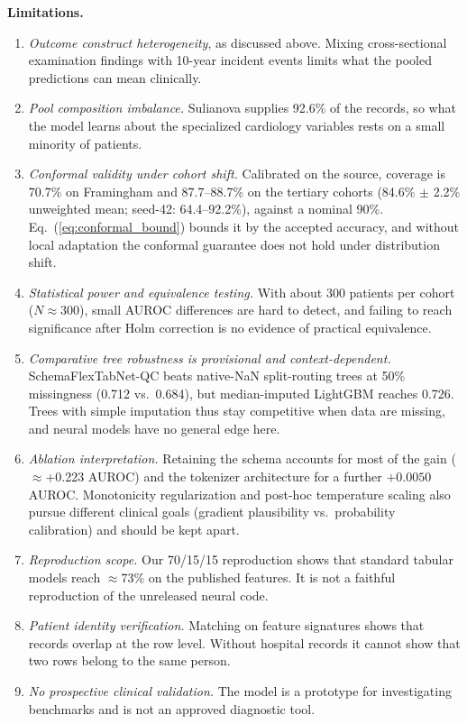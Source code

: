 \documentclass[conference]{IEEEtran}
\newcommand{\sfn}{SchemaFlexTabNet-QC}
\begin{document}
\textbf{Limitations.}
\begin{enumerate}
\item \emph{Outcome construct heterogeneity}, as discussed above. Mixing cross-sectional examination findings with 10-year incident events limits what the pooled predictions can mean clinically.
\item \emph{Pool composition imbalance.} Sulianova supplies 92.6\% of the records, so what the model learns about the specialized cardiology variables rests on a small minority of patients.
\item \emph{Conformal validity under cohort shift.} Calibrated on the source, coverage is 70.7\% on Framingham and 87.7--88.7\% on the tertiary cohorts (84.6\% $\pm$ 2.2\% unweighted mean; seed-42: 64.4--92.2\%), against a nominal 90\%. Eq.~(\ref{eq:conformal_bound}) bounds it by the accepted accuracy, and without local adaptation the conformal guarantee does not hold under distribution shift.
\item \emph{Statistical power and equivalence testing.} With about 300 patients per cohort ($N\approx 300$), small AUROC differences are hard to detect, and failing to reach significance after Holm correction is no evidence of practical equivalence.
\item \emph{Comparative tree robustness is provisional and context-dependent.} \sfn{} beats native-NaN split-routing trees at 50\% missingness (0.712 vs.\ 0.684), but median-imputed LightGBM reaches 0.726. Trees with simple imputation thus stay competitive when data are missing, and neural models have no general edge here.
\item \emph{Ablation interpretation.} Retaining the schema accounts for most of the gain ($\approx$+0.223 AUROC) and the tokenizer architecture for a further $+0.0050$ AUROC. Monotonicity regularization and post-hoc temperature scaling also pursue different clinical goals (gradient plausibility vs.\ probability calibration) and should be kept apart.
\item \emph{Reproduction scope.} Our 70/15/15 reproduction shows that standard tabular models reach $\approx$73\% on the published features. It is not a faithful reproduction of the unreleased neural code.
\item \emph{Patient identity verification.} Matching on feature signatures shows that records overlap at the row level. Without hospital records it cannot show that two rows belong to the same person.
\item \emph{No prospective clinical validation.} The model is a prototype for investigating benchmarks and is not an approved diagnostic tool.
\end{enumerate}
\end{document}
